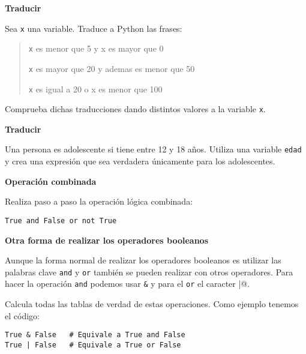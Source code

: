 \documentclass[a4paper, 11pt]{scrartcl}
\newenvironment{code}{\begin{tcolorbox}[colback=red!2!white]}{\end{tcolorbox}}
\begin{document}
\noindent\textbf{\sffamily Traducir}

Sea \verb|x| una variable. Traduce a Python las frases:

\begin{quote}

\verb|x| es menor que 5 y x es mayor que 0

\verb|x| es mayor que 20 y ademas es menor que 50

\verb|x| es igual a 20 o x es menor que 100

\end{quote}

Comprueba dichas traducciones dando distintos valores a la variable \verb|x|.





\noindent\textbf{\sffamily Traducir}

Una persona es adolescente si tiene entre 12 y 18 años. Utiliza una variable \verb|edad| y crea una expresión que sea verdadera únicamente para los adolescentes.





\noindent\textbf{\sffamily Operación combinada}

Realiza paso a paso la operación lógica combinada:

\smallskip

\begin{code}

\begin{verbatim}
True and False or not True
\end{verbatim}

\end{code}






\noindent\textbf{\sffamily \dag{}  Otra forma de realizar los operadores booleanos}

Aunque la forma normal de realizar los operadores booleanos es utilizar las palabras clave \verb|and| y \verb|or| también se pueden realizar con otros operadores. Para hacer la operación \verb|and| podemos usar \verb|&|  y para el \verb|or| el caracter \verb@|@.

Calcula todas las tablas de verdad de estas operaciones. Como ejemplo tenemos el código:

\smallskip

\begin{code}

\begin{verbatim}
True & False   # Equivale a True and False
True | False   # Equivale a True or False
\end{verbatim}

\end{code}
\end{document}
